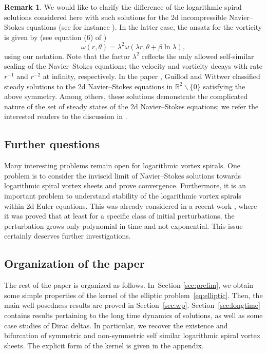 \documentclass[10pt]{amsart}
\theoremstyle{plain}
\theoremstyle{definition}
\newtheorem{remark}[theorem]{Remark}
\let\bt\beta
\let\lmb\lambda
\begin{document}
\begin{remark}
We would like to clarify the difference of the logarithmic spiral solutions considered here with such solutions for the 2d incompressible Navier--Stokes equations (see for instance \cite{GuWi,GuWi2,Sve,Hamel,Landau}). In the latter case, the ansatz for the vorticity is given by (see equation (6) of \cite{GuWi})
\[
\omega(r,\theta)=\lmb^{2} \omega(\lmb r, \theta + \bt \ln \lmb),
\]
using our notation. Note that the factor $\lmb^{2}$ reflects the only allowed self-similar scaling of the Navier--Stokes equations; the velocity and vorticity decays with rate $r^{-1}$ and $r^{-2}$ at infinity, respectively. In the paper \cite{GuWi}, Guillod and Wittwer classified steady solutions to the 2d Navier--Stokes equations in $\mathbb{R}^{2}\backslash \{0\}$ satisfying the above symmetry. Among others, these solutions demonstrate the complicated nature of the set of steady states of the 2d Navier--Stokes equations; we refer the interested readers to the discussion in \cite{GuWi}.
\end{remark}

\subsection{Further questions} Many interesting problems remain open for logarithmic vortex spirals. One problem is to consider the inviscid limit of Navier--Stokes solutions towards logarithmic spiral vortex sheets and prove convergence. Furthermore, it is an important problem to understand stability of the logarithmic vortex spirals within 2d Euler equations. This was already considered in a recent work \cite{CKW24}, where it was proved that at least for a specific class of initial perturbations, the perturbation grows only polynomial in time and not exponential. This issue certainly deserves further investigations.

\subsection{Organization of the paper} The rest of the paper is organized as follows. In~Section \ref{sec:prelim}, we obtain some simple properties of the kernel of the elliptic problem~\eqref{eq:elliptic}. Then, the main well-posedness results are proved in Section~\ref{sec:wp}. Section~\ref{sec:longtime} contains results pertaining to the long time dynamics of solutions, as well as some case studies of Dirac deltas. In particular, we recover the existence and bifurcation of symmetric and non-symmetric self similar logarithmic spiral vortex sheets. The explicit form of the kernel is given in the appendix.
\end{document}
